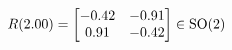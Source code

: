 \documentclass[preview]{standalone}
\begin{document}
\begin{align*}
\special{dvisvgm:raw <g id='unique000'>}R(2.00) = \begin{bmatrix} -0.42 & -0.91 \\ 0.91 & -0.42 \end{bmatrix} \in \text{SO}(2)\special{dvisvgm:raw </g>}
\end{align*}
\end{document}
